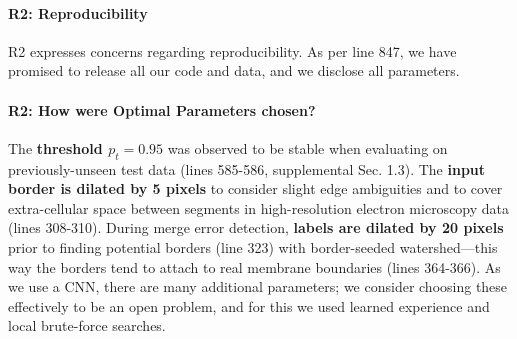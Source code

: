 \documentclass[10pt,twocolumn,letterpaper]{article}
\begin{document}
\paragraph{R2: Reproducibility}
R2 expresses concerns regarding reproducibility. As per line 847, we have promised to release all our code and data, and we disclose all parameters.

\paragraph{R2: How were Optimal Parameters chosen?}
The \textbf{threshold $p_t=0.95$} was observed to be stable when evaluating on previously-unseen test data (lines 585-586, supplemental Sec. 1.3). The \textbf{input border is dilated by 5 pixels} to consider slight edge ambiguities and to cover extra-cellular space between segments in high-resolution electron microscopy data (lines 308-310). During merge error detection, \textbf{labels are dilated by 20 pixels} prior to finding potential borders (line 323) with border-seeded watershed---this way the borders tend to attach to real membrane boundaries (lines 364-366). As we use a CNN, there are many additional parameters; we consider choosing these effectively to be an open problem, and for this we used learned experience and local brute-force searches.

%
\end{document}
